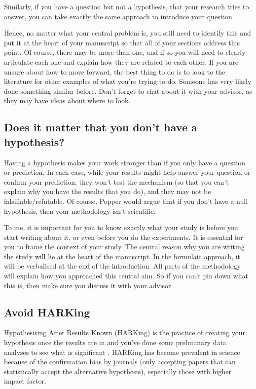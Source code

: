 \documentclass[
]{krantz}
\begin{document}
Similarly, if you have a question but not a hypothesis, that your research tries to answer, you can take exactly the same approach to introduce your question.

Hence, no matter what your central problem is, you still need to identify this and put it at the heart of your manuscript so that all of your sections address this point. Of course, there may be more than one, and if so you will need to clearly articulate each one and explain how they are related to each other. If you are unsure about how to move forward, the best thing to do is to look to the literature for other examples of what you're trying to do. Someone has very likely done something similar before. Don't forget to chat about it with your advisor, as they may have ideas about where to look.

\hypertarget{does-it-matter-that-you-dont-have-a-hypothesis}{%
\subsection{Does it matter that you don't have a hypothesis?}\label{does-it-matter-that-you-dont-have-a-hypothesis}}

Having a hypothesis makes your work stronger than if you only have a question or prediction. In each case, while your results might help answer your question or confirm your prediction, they won't test the mechanism (so that you can't explain why you have the results that you do), and they may not be falsifiable/refutable. Of course, Popper would argue that if you don't have a null hypothesis, then your methodology isn't scientific.

To me, it is important for you to know exactly what your study is before you start writing about it, or even before you do the experiments. It is essential for you to frame the context of your study. The central reason why you are writing the study will lie at the heart of the manuscript. In the formulaic approach, it will be verbalised at the end of the introduction. All parts of the methodology will explain how you approached this central aim. So if you can't pin down what this is, then make sure you discuss it with your advisor.

\hypertarget{avoid-harking}{%
\subsection{Avoid HARKing}\label{avoid-harking}}

Hypothesising After Results Known (HARKing) is the practice of creating your hypothesis once the results are in and you've done some preliminary data analyses to see what is significant \citep{forstmeier2017detecting}. HARKing has become prevalent in science because of the confirmation bias by journals (only accepting papers that can statistically accept the alternative hypothesis), especially those with higher impact factor.
\end{document}
